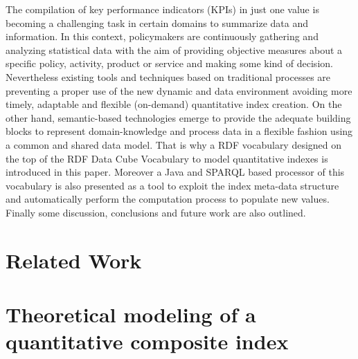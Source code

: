 The compilation of key performance indicators (KPIs) in just one value is 
becoming a challenging task in certain domains to summarize data and information. 
In this context, policymakers are continuously gathering and analyzing statistical 
data with the aim of providing objective measures about a specific policy, activity, 
product or service and making some kind of decision. Nevertheless existing tools 
and techniques based on traditional processes are preventing a 
proper use of the new dynamic and data environment avoiding more timely, 
adaptable and flexible (on-demand) quantitative index creation. On the other hand, 
semantic-based technologies emerge to provide the adequate building blocks 
to represent domain-knowledge and process data in a flexible fashion 
using a common and shared data model. That is why a RDF vocabulary designed on 
the top of the RDF Data Cube Vocabulary to model quantitative indexes 
is introduced in this paper. Moreover a Java and SPARQL based processor 
of this vocabulary is also presented as a tool to exploit the index meta-data structure and automatically 
perform the computation process to populate new values. Finally some discussion, 
conclusions and future work are also outlined.

\section{Related Work}

\section{Theoretical modeling of a quantitative composite index}


